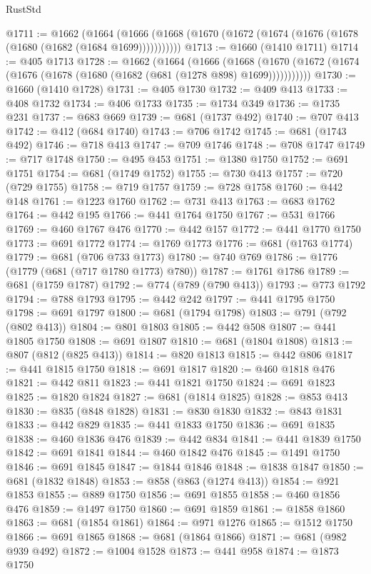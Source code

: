 \begin{lexlean}{RustStd}
\begin{coremodule}
@1711 := @1662
    (@1664 (@1666 (@1668 (@1670 (@1672 (@1674 (@1676 (@1678 (@1680 (@1682 (@1684 @1699)))))))))))
@1713 := @1660 (@1410 @1711)
@1714 := @405 @1713
@1728 := @1662
    (@1664
      (@1666
        (@1668 (@1670 (@1672 (@1674 (@1676 (@1678 (@1680 (@1682 (@681 (@1278 @898) @1699)))))))))))
@1730 := @1660 (@1410 @1728)
@1731 := @405 @1730
@1732 := @409 @413
@1733 := @408 @1732
@1734 := @406 @1733
@1735 := @1734 @349
@1736 := @1735 @231
@1737 := @683 @669
@1739 := @681 (@1737 @492)
@1740 := @707 @413
@1742 := @412 (@684 @1740)
@1743 := @706 @1742
@1745 := @681 (@1743 @492)
@1746 := @718 @413
@1747 := @709 @1746
@1748 := @708 @1747
@1749 := @717 @1748
@1750 := @495 @453
@1751 := @1380 @1750
@1752 := @691 @1751
@1754 := @681 (@1749 @1752)
@1755 := @730 @413
@1757 := @720 (@729 @1755)
@1758 := @719 @1757
@1759 := @728 @1758
@1760 := @442 @148
@1761 := @1223 @1760
@1762 := @731 @413
@1763 := @683 @1762
@1764 := @442 @195
@1766 := @441 @1764 @1750
@1767 := @531 @1766
@1769 := @460 @1767 @476
@1770 := @442 @157
@1772 := @441 @1770 @1750
@1773 := @691 @1772
@1774 := @1769 @1773
@1776 := @681 (@1763 @1774)
@1779 := @681 (@706 @733 @1773)
@1780 := @740 @769
@1786 := @1776 (@1779 (@681 (@717 @1780 @1773) @780))
@1787 := @1761 @1786
@1789 := @681 (@1759 @1787)
@1792 := @774 (@789 (@790 @413))
@1793 := @773 @1792
@1794 := @788 @1793
@1795 := @442 @242
@1797 := @441 @1795 @1750
@1798 := @691 @1797
@1800 := @681 (@1794 @1798)
@1803 := @791 (@792 (@802 @413))
@1804 := @801 @1803
@1805 := @442 @508
@1807 := @441 @1805 @1750
@1808 := @691 @1807
@1810 := @681 (@1804 @1808)
@1813 := @807 (@812 (@825 @413))
@1814 := @820 @1813
@1815 := @442 @806
@1817 := @441 @1815 @1750
@1818 := @691 @1817
@1820 := @460 @1818 @476
@1821 := @442 @811
@1823 := @441 @1821 @1750
@1824 := @691 @1823
@1825 := @1820 @1824
@1827 := @681 (@1814 @1825)
@1828 := @853 @413
@1830 := @835 (@848 @1828)
@1831 := @830 @1830
@1832 := @843 @1831
@1833 := @442 @829
@1835 := @441 @1833 @1750
@1836 := @691 @1835
@1838 := @460 @1836 @476
@1839 := @442 @834
@1841 := @441 @1839 @1750
@1842 := @691 @1841
@1844 := @460 @1842 @476
@1845 := @1491 @1750
@1846 := @691 @1845
@1847 := @1844 @1846
@1848 := @1838 @1847
@1850 := @681 (@1832 @1848)
@1853 := @858 (@863 (@1274 @413))
@1854 := @921 @1853
@1855 := @889 @1750
@1856 := @691 @1855
@1858 := @460 @1856 @476
@1859 := @1497 @1750
@1860 := @691 @1859
@1861 := @1858 @1860
@1863 := @681 (@1854 @1861)
@1864 := @971 @1276
@1865 := @1512 @1750
@1866 := @691 @1865
@1868 := @681 (@1864 @1866)
@1871 := @681 (@982 @939 @492)
@1872 := @1004 @1528
@1873 := @441 @958
@1874 := @1873 @1750

\end{coremodule}
\end{lexlean}
